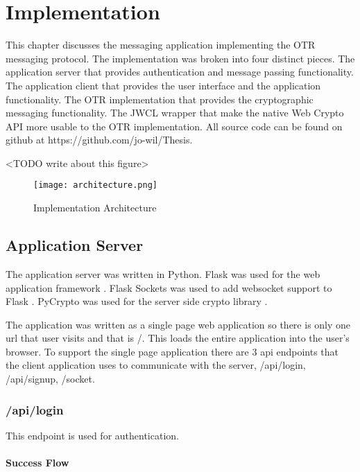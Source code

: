 \chapter{Implementation}


This chapter discusses the messaging application implementing the OTR messaging protocol. The implementation was broken into four distinct pieces. The application server that provides authentication and message passing functionality. The application client that provides the user interface and the application functionality. The OTR implementation that provides the cryptographic messaging functionality. The JWCL wrapper that make the native Web Crypto API more usable to the OTR implementation. All source code can be found on github at https://github.com/jo-wil/Thesis.

<TODO write about this figure>

\begin{figure}[!htbp]
    \centering
    \texttt{[image: architecture.png]}
    \caption{Implementation Architecture}
    \label{fig:architecture}
\end{figure}


\section{Application Server}


The application server was written in Python. Flask was used for the web application framework \cite{flask}. Flask Sockets was used to add websocket support to Flask \cite{flask-sockets}. PyCrypto was used for the server side crypto library \cite{pycrypto}.


The application was written as a single page web application so there is only one url that user visits and that is /. This loads the entire application into the user's browser. To support the single page application there are 3 api endpoints that the client application uses to communicate with the server, /api/login, /api/signup, /socket.


\subsection{/api/login}


This endpoint is used for authentication. 


\subsubsection{Success Flow}


